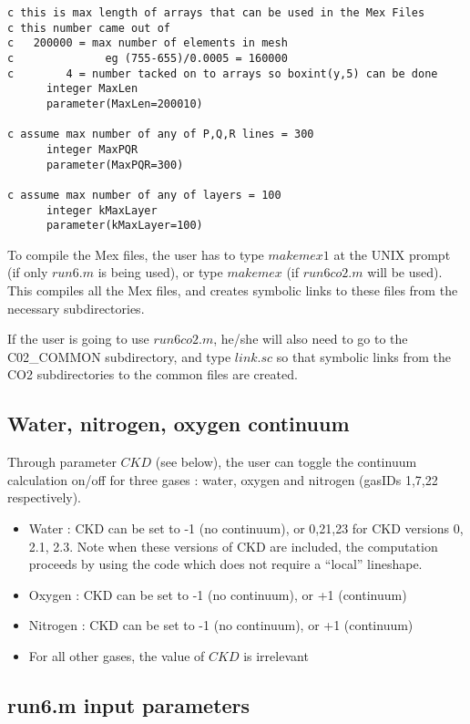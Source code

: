 \documentclass[11pt]{article}
\begin{document}
\begin{verbatim}
c this is max length of arrays that can be used in the Mex Files  
c this number came out of 
c   200000 = max number of elements in mesh 
c              eg (755-655)/0.0005 = 160000
c        4 = number tacked on to arrays so boxint(y,5) can be done  
      integer MaxLen
      parameter(MaxLen=200010)

c assume max number of any of P,Q,R lines = 300
      integer MaxPQR
      parameter(MaxPQR=300)

c assume max number of any of layers = 100
      integer kMaxLayer
      parameter(kMaxLayer=100)
\end{verbatim}

To compile the Mex files, the user has to type $makemex1$ at the UNIX 
prompt 
(if only $run6.m$ is being used), or type $makemex$ (if $run6co2.m$ will be 
used). This compiles all the Mex files, and creates symbolic links to these
files from the necessary subdirectories.

If the user is going to use $run6co2.m$, he/she will also need to go to the 
C02\_COMMON subdirectory, and type $link.sc$ so that symbolic links from the
CO2 subdirectories to the common files are created.

\subsection{Water, nitrogen, oxygen continuum}
Through parameter $CKD$ (see below), the user can toggle the continuum 
calculation on/off for three gases : water, oxygen and nitrogen 
(gasIDs 1,7,22 respectively). 

\begin{itemize}
\item Water : CKD can be set to -1 (no continuum), or 0,21,23 for CKD 
              versions 0, 2.1, 2.3. Note when these versions of CKD 
              are included, the computation proceeds by using the code which
              does not require a ``local'' lineshape.
\item Oxygen : CKD can be set to -1 (no continuum), or +1 (continuum)
\item Nitrogen : CKD can be set to -1 (no continuum), or +1 (continuum)
\item For all other gases, the value of $CKD$ is irrelevant
\end{itemize}

\subsection{run6.m input parameters}
\end{document}
